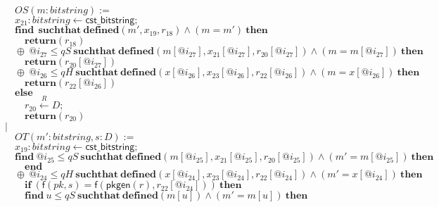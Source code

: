\documentclass{article}
\newcommand{\store}{\leftarrow}
\newcommand{\getR}{\stackrel{R}{\store}}
\newcommand{\kw}[1]{\mathbf{#1}}
\newcommand{\kwf}[1]{\mathsf{#1}}
\newcommand{\var}[1]{\mathit{#1}}
\newcommand{\kwt}[1]{\mathit{#1}}
\newcommand{\kwp}[1]{\mathit{#1}}
\begin{document}
\begin{tabbing}
$\quad \quad OS(\var{m}: \kwt{bitstring}) :=$\\
$\quad \quad \var{x}_{21}: \kwt{bitstring} \store \kwf{cst\_bitstring};$\\
$\quad \quad \kw{find}\ \ \kw{suchthat}\ \kw{defined}(\var{m'}, \var{x}_{19}, \var{r}_{18})\wedge (\var{m}  =  \var{m'})\ \kw{then}$\\
$\quad \quad \quad \kw{return}\kwf{}(\var{r}_{18})$\\
$\quad \quad \oplus\ \var{@i}_{27} \leq \kwp{qS}\ \kw{suchthat}\ \kw{defined}(\var{m}[\var{@i}_{27}], \var{x}_{21}[\var{@i}_{27}], \var{r}_{20}[\var{@i}_{27}])\wedge (\var{m}  =  \var{m}[\var{@i}_{27}])\ \kw{then}$\\
$\quad \quad \quad \kw{return}\kwf{}(\var{r}_{20}[\var{@i}_{27}])$\\
$\quad \quad \oplus\ \var{@i}_{26} \leq \kwp{qH}\ \kw{suchthat}\ \kw{defined}(\var{x}[\var{@i}_{26}], \var{x}_{23}[\var{@i}_{26}], \var{r}_{22}[\var{@i}_{26}])\wedge (\var{m}  =  \var{x}[\var{@i}_{26}])\ \kw{then}$\\
$\quad \quad \quad \kw{return}\kwf{}(\var{r}_{22}[\var{@i}_{26}])$\\
$\quad \quad \kw{else}$\\
$\quad \quad \quad \var{r}_{20} \getR \kwt{D};$\\
$\quad \quad \quad \kw{return}\kwf{}(\var{r}_{20})$\\
$\quad |$\\
$\quad \quad OT(\var{m'}: \kwt{bitstring}, \var{s}: \kwt{D}) :=$\\
$\quad \quad \var{x}_{19}: \kwt{bitstring} \store \kwf{cst\_bitstring};$\\
$\quad \quad \kw{find}\ \var{@i}_{25} \leq \kwp{qS}\ \kw{suchthat}\ \kw{defined}(\var{m}[\var{@i}_{25}], \var{x}_{21}[\var{@i}_{25}], \var{r}_{20}[\var{@i}_{25}])\wedge (\var{m'}  =  \var{m}[\var{@i}_{25}])\ \kw{then}$\\
$\quad \quad \quad \kw{end}$\\
$\quad \quad \oplus\ \var{@i}_{24} \leq \kwp{qH}\ \kw{suchthat}\ \kw{defined}(\var{x}[\var{@i}_{24}], \var{x}_{23}[\var{@i}_{24}], \var{r}_{22}[\var{@i}_{24}])\wedge (\var{m'}  =  \var{x}[\var{@i}_{24}])\ \kw{then}$\\
$\quad \quad \quad \kw{if}\ (\kwf{f}(\var{pk}, \var{s})  =  \kwf{f}(\kwf{pkgen}(\var{r}), \var{r}_{22}[\var{@i}_{24}]))\ \kw{then}$\\
$\quad \quad \quad \kw{find}\ \var{u} \leq \kwp{qS}\ \kw{suchthat}\ \kw{defined}(\var{m}[\var{u}])\wedge (\var{m'}  =  \var{m}[\var{u}])\ \kw{then}$\\

\end{tabbing}
\end{document}
